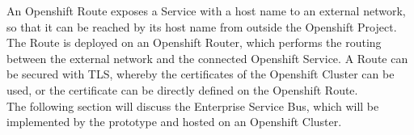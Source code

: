 An Openshift Route exposes a Service with a host name to an external network, so that it can be reached by its host name from outside the Openshift Project. The Route is deployed on an Openshift Router, which performs the routing between the external network and the connected Openshift Service. A Route can be secured with TLS, whereby the certificates of the Openshift Cluster can be used, or the certificate can be directly defined on the Openshift Route. \\

The following section will discuss the Enterprise Service Bus, which will be implemented by the prototype and hosted on an Openshift Cluster.